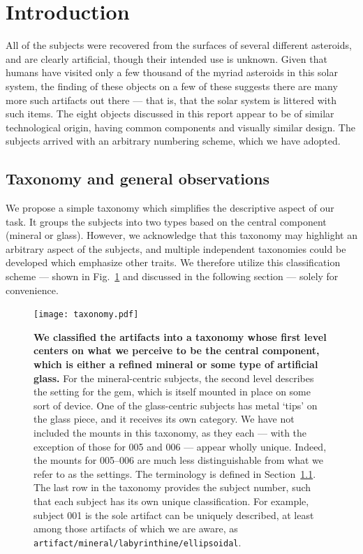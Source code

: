 \documentclass[10pt,twoside,openany]{article}
\theoremstyle{definition}
\begin{document}
\section{Introduction}
All of the subjects were recovered from the surfaces of several different asteroids, and are clearly artificial, though their intended use is unknown.
Given that humans have visited only a few thousand of the myriad asteroids in this solar system, the finding of these objects on a few of these suggests there are many more such artifacts out there --- that is, that the solar system is littered with such items.
The eight objects discussed in this report appear to be of similar technological origin, having common components and visually similar design.
The subjects arrived with an arbitrary numbering scheme, which we have adopted.

\subsection{Taxonomy and general observations}\label{sec:taxonomy}
We propose a simple taxonomy which simplifies the descriptive aspect of our task.
It groups the subjects into two types based on the central component (mineral or glass).
However, we acknowledge that this taxonomy may highlight an arbitrary aspect of the subjects, and multiple independent taxonomies could be developed which emphasize other traits.
We therefore utilize this classification scheme --- shown in Fig.~\ref{fig:taxonomy} and discussed in the following section --- solely for convenience.

\begin{figure}[p]
    \texttt{[image: taxonomy.pdf]}
\caption{\label{fig:taxonomy}\textbf{We classified the artifacts into a taxonomy whose first level centers on what we perceive to be the central component, which is either a refined mineral or some type of artificial glass.} For the mineral-centric subjects, the second level describes the setting for the gem, which is itself mounted in place on some sort of device. One of the glass-centric subjects has metal `tips' on the glass piece, and it receives its own category. We have not included the mounts in this taxonomy, as they each --- with the exception of those for 005 and 006 --- appear wholly unique. Indeed, the mounts for 005--006 are much less distinguishable from what we refer to as the settings. The terminology is defined in Section~\ref{sec:taxonomy}. The last row in the taxonomy provides the subject number, such that each subject has its own unique classification. For example, subject 001 is the sole artifact can be uniquely described, at least among those artifacts of which we are aware, as \texttt{artifact/mineral/labyrinthine/ellipsoidal}.}%
\end{figure}
\end{document}
